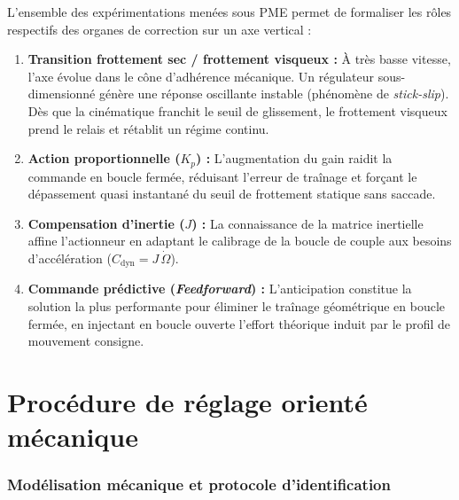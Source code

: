 \documentclass[12pt,a4paper]{article}
\begin{document}
L'ensemble des expérimentations menées sous PME permet de formaliser les rôles respectifs des organes de correction sur un axe vertical :
\begin{enumerate}
    \item \textbf{Transition frottement sec / frottement visqueux :} À très basse vitesse, l'axe évolue dans le cône d'adhérence mécanique. Un régulateur sous-dimensionné génère une réponse oscillante instable (phénomène de \textit{stick-slip}). Dès que la cinématique franchit le seuil de glissement, le frottement visqueux prend le relais et rétablit un régime continu.
    \item \textbf{Action proportionnelle ($K_p$) :} L'augmentation du gain raidit la commande en boucle fermée, réduisant l'erreur de traînage et forçant le dépassement quasi instantané du seuil de frottement statique sans saccade.
    \item \textbf{Compensation d'inertie ($J$) :} La connaissance de la matrice inertielle affine l'actionneur en adaptant le calibrage de la boucle de couple aux besoins d'accélération ($C_{\text{dyn}} = J \, \dot{\Omega}$).
    \item \textbf{Commande prédictive (\textit{Feedforward}) :} L'anticipation constitue la solution la plus performante pour éliminer le traînage géométrique en boucle fermée, en injectant en boucle ouverte l'effort théorique induit par le profil de mouvement consigne.
\end{enumerate}

\clearpage

\part{Procédure de réglage orienté mécanique}

\section{Modélisation mécanique et protocole d'identification}
\end{document}
